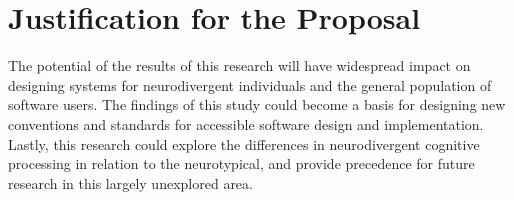 \section{Justification for the Proposal}
The potential of the results of this research will have widespread impact on designing systems for neurodivergent individuals and the general population of software users. The findings of this study could become a basis for designing new conventions and standards for accessible \cite{conrad2023, kosch2023, lowy2023} software design and implementation. Lastly, this research could explore the differences in neurodivergent cognitive processing in relation to the neurotypical, and provide precedence for future research in this largely unexplored area.